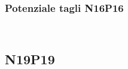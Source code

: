 \begin{frame}
\frametitle{Potenziale tagli N16P16}
\begin{columns}

\begin{column}{0.3 \textwidth}
\begin{center}
\begin{figure}[!h]
          \end{figure}
\end{center}
\end{column}

\begin{column}{0.3 \textwidth}
\begin{center}
\begin{figure}[!h]
\end{figure}
\end{center}
\end{column}

\begin{column}{0.3 \textwidth}
\begin{center}
\begin{figure}[!h]
\end{figure}
\end{center}
\end{column}

\end{columns}
\end{frame}

\subsection{N19P19}

\begin{frame}
\tableofcontents[currentsection]
\end{frame}

